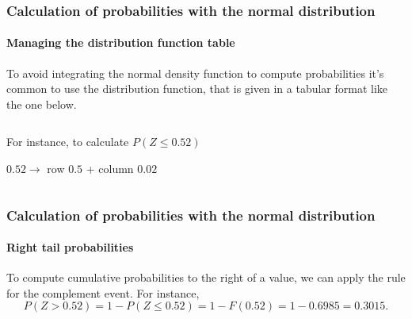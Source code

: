 \begin{frame}
\frametitle{Calculation of probabilities with the normal distribution}
\framesubtitle{Managing the distribution function table}
To avoid integrating the normal density function to compute probabilities it's common to use the distribution function,
that is given in a tabular format like the one below.

\begin{columns}
\begin{column}{0.47\textwidth}
\begin{center}
For instance, to calculate $P(Z\leq 0.52)$


$0.52 \rightarrow $ row $0.5$ + column $0.02$
\end{center}
\end{column}
\begin{column}{0.53\textwidth}
\begin{center}
\end{center}
\end{column}
\end{columns}
\end{frame}


\begin{frame}
\frametitle{Calculation of probabilities with the normal distribution}
\framesubtitle{Right tail probabilities}
To compute cumulative probabilities to the right of a value, we can apply the rule for the complement event.
For instance, 
\[
P(Z>0.52) =1-P(Z\leq 0.52) = 1-F(0.52) = 1 - 0.6985 = 0.3015.
\]
\begin{center}
\end{center}
\end{frame}


